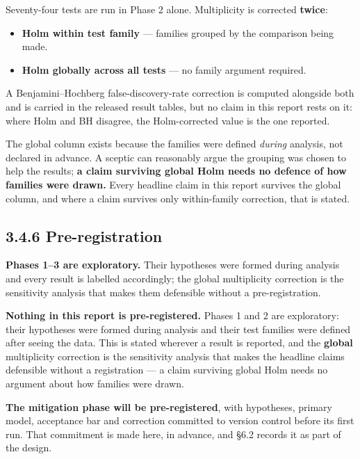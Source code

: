 Seventy-four tests are run in Phase 2 alone. Multiplicity is corrected
\textbf{twice}:

\begin{itemize}
\tightlist
\item
  \textbf{Holm within test family} \citep{holm1979} --- families grouped
  by the comparison being made.
\item
  \textbf{Holm globally across all tests} --- no family argument
  required.
\end{itemize}

A Benjamini--Hochberg false-discovery-rate correction
\citep{benjamini1995fdr} is computed alongside both and is carried in
the released result tables, but no claim in this report rests on it:
where Holm and BH disagree, the Holm-corrected value is the one
reported.

The global column exists because the families were defined \emph{during}
analysis, not declared in advance. A sceptic can reasonably argue the
grouping was chosen to help the results; \textbf{a claim surviving
global Holm needs no defence of how families were drawn.} Every headline
claim in this report survives the global column, and where a claim
survives only within-family correction, that is stated.

\subsection{3.4.6 Pre-registration}\label{pre-registration}

\textbf{Phases 1--3 are exploratory.} Their hypotheses were formed
during analysis and every result is labelled accordingly; the global
multiplicity correction is the sensitivity analysis that makes them
defensible without a pre-registration.

\textbf{Nothing in this report is pre-registered.} Phases 1 and 2 are
exploratory: their hypotheses were formed during analysis and their test
families were defined after seeing the data. This is stated wherever a
result is reported, and the \textbf{global} multiplicity correction is
the sensitivity analysis that makes the headline claims defensible
without a registration --- a claim surviving global Holm needs no
argument about how families were drawn.

\textbf{The mitigation phase will be pre-registered}, with hypotheses,
primary model, acceptance bar and correction committed to version
control before its first run. That commitment is made here, in advance,
and \S{}6.2 records it as part of the design.

